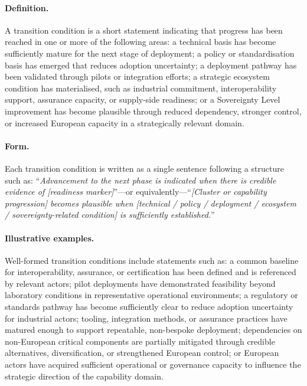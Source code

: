 \paragraph{Definition.}
A transition condition is a short statement indicating that progress has been reached in one or more of the following areas: a technical basis has become sufficiently mature for the next stage of deployment; a policy or standardisation basis has emerged that reduces adoption uncertainty; a deployment pathway has been validated through pilots or integration efforts; a strategic ecosystem condition has materialised, such as industrial commitment, interoperability support, assurance capacity, or supply-side readiness; or a Sovereignty Level improvement has become plausible through reduced dependency, stronger control, or increased European capacity in a strategically relevant domain.

\paragraph{Form.}
Each transition condition is written as a single sentence following a structure such as: ``\textit{Advancement to the next phase is indicated when there is credible evidence of [readiness marker]}''---or equivalently---``\textit{[Cluster or capability progression] becomes plausible when [technical / policy / deployment / ecosystem / sovereignty-related condition] is sufficiently established.}''

\paragraph{Illustrative examples.}
Well-formed transition conditions include statements such as: a common baseline for interoperability, assurance, or certification has been defined and is referenced by relevant actors; pilot deployments have demonstrated feasibility beyond laboratory conditions in representative operational environments; a regulatory or standards pathway has become sufficiently clear to reduce adoption uncertainty for industrial actors; tooling, integration methods, or assurance practices have matured enough to support repeatable, non-bespoke deployment; dependencies on non-European critical components are partially mitigated through credible alternatives, diversification, or strengthened European control; or European actors have acquired sufficient operational or governance capacity to influence the strategic direction of the capability domain.

